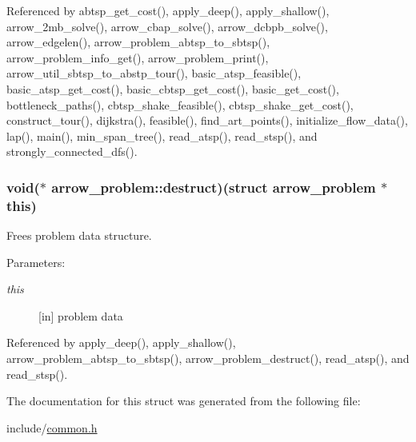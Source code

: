 Referenced by abtsp\_\-get\_\-cost(), apply\_\-deep(), apply\_\-shallow(), arrow\_\-2mb\_\-solve(), arrow\_\-cbap\_\-solve(), arrow\_\-dcbpb\_\-solve(), arrow\_\-edgelen(), arrow\_\-problem\_\-abtsp\_\-to\_\-sbtsp(), arrow\_\-problem\_\-info\_\-get(), arrow\_\-problem\_\-print(), arrow\_\-util\_\-sbtsp\_\-to\_\-abstp\_\-tour(), basic\_\-atsp\_\-feasible(), basic\_\-atsp\_\-get\_\-cost(), basic\_\-cbtsp\_\-get\_\-cost(), basic\_\-get\_\-cost(), bottleneck\_\-paths(), cbtsp\_\-shake\_\-feasible(), cbtsp\_\-shake\_\-get\_\-cost(), construct\_\-tour(), dijkstra(), feasible(), find\_\-art\_\-points(), initialize\_\-flow\_\-data(), lap(), main(), min\_\-span\_\-tree(), read\_\-atsp(), read\_\-stsp(), and strongly\_\-connected\_\-dfs().\hypertarget{structarrow__problem_ff7c7873a7e7130a16e2a49da20ee625}{
\subsubsection{\setlength{\rightskip}{0pt plus 5cm}void($\ast$ {\bf arrow\_\-problem::destruct})(struct {\bf arrow\_\-problem} $\ast$this)}}
\label{structarrow__problem_ff7c7873a7e7130a16e2a49da20ee625}


Frees problem data structure. 

\begin{Desc}
\item[Parameters:]
\begin{description}
\item[{\em this}]\mbox{[}in\mbox{]} problem data \end{description}
\end{Desc}


Referenced by apply\_\-deep(), apply\_\-shallow(), arrow\_\-problem\_\-abtsp\_\-to\_\-sbtsp(), arrow\_\-problem\_\-destruct(), read\_\-atsp(), and read\_\-stsp().

The documentation for this struct was generated from the following file:\begin{CompactItemize}
\item 
include/\hyperlink{common_8h}{common.h}\end{CompactItemize}
